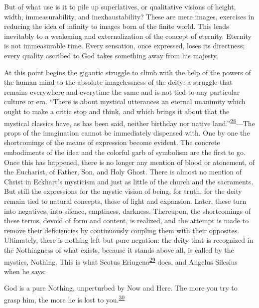 But of what use is it to pile up superlatives, or qualitative visions of
height, width, immeasurability, and inexhaustability? These are mere
images, exercises in reducing the idea of infinity to images born of the
finite world. This leads inevitably to a weakening and externalization
of the concept of eternity. Eternity is not immeasurable time. Every
sensation, once expressed, loses its directness; every quality ascribed
to God takes something away from his majesty.

At this point begins the gigantic struggle to climb with the help of the
powers of the human mind to the absolute imagelessness of the deity: a
struggle that remains everywhere and everytime the same and is not tied
to any particular culture or era. ``There is about mystical utterances
an eternal unanimity which ought to make a critic stop and think, and
which brings it about that the mystical classics have, as has been said,
neither birthday nor native
land.''\textsuperscript{\protect\hypertarget{17_Chapter_Ten__THE_FAILURE_OF_IMAG.xhtmlux5cux23id_680}{\protect\hyperlink{23_NOTES.xhtmlux5cux23id_681}{28}}}---The
props of the imagination cannot be immediately dispensed with. One by
one the shortcomings of the means of expression become evident. The
concrete embodiments of the idea and the colorful garb of symbolism are
the first to go. Once this has happened, there is no longer any mention
of blood or atonement, of the Eucharist, of Father, Son, and Holy Ghost.
There is almost no mention of Christ in Eckhart's mysticism and just as
little of the church and the sacraments. But still the expressions for
the mystic vision of being, for truth, for the deity remain tied to
natural concepts, those of light and expansion. Later, these turn into
negatives, into silence, emptiness, darkness. Thereupon, the
shortcomings of these terms, devoid of form and content, is realized,
and the attempt is made to remove their deficiencies by continuously
cou\protect\hypertarget{17_Chapter_Ten__THE_FAILURE_OF_IMAG.xhtmlux5cux23page_258}{}{}pling
them with their opposites. Ultimately, there is nothing left but pure
negation: the deity that is recognized in the Nothingness of what
exists, because it stands above all, is called by the mystics, Nothing.
This is what Scotus
Eriugena\textsuperscript{\protect\hypertarget{17_Chapter_Ten__THE_FAILURE_OF_IMAG.xhtmlux5cux23id_678}{\protect\hyperlink{23_NOTES.xhtmlux5cux23id_679}{29}}}
does, and Angelus Silesius when he says:

God is a pure Nothing, unperturbed by Now and Here. The more you try to
grasp him, the more he is lost to
you.\textsuperscript{\protect\hypertarget{17_Chapter_Ten__THE_FAILURE_OF_IMAG.xhtmlux5cux23id_676}{\protect\hyperlink{23_NOTES.xhtmlux5cux23id_677}{30}}}

